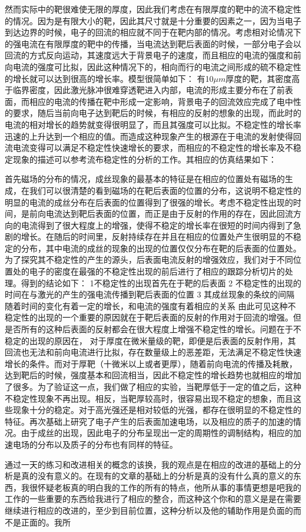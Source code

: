 然而实际中的靶很难使无限的厚度，因此我们考虑在有限厚度的靶中的流不稳定性的情况。因为是有限大小的靶，因此其尺寸就是十分重要的因素之一，因为当电子到达边界的时候，电子的回流的相应就不同于在靶内部的情况。考虑相对论情况下的强电流在有限厚度的靶中的传播，当电流达到靶后表面的时候，一部分电子会以回流的方式反向运动，其速度远大于背景电子的速度，而且相应的电流的强度和前向电流的强度可比拟，因此这种情况下的，相向而行的电流之间形成的硫不稳定性的增长就可以达到很高的增长率。模型很简单如下： 有10$\mu m$厚度的靶，其密度高于临界密度，因此激光脉冲很难穿透靶进入内部，电流的形成主要分布在了前表面，而相应的电流的传播在靶中形成一定影响，背景电子的回流效应完成了电中性的要求，随后当前向电子达到靶后的时候，有相应的反射的想象的出现，而此时的电流的相对增长的趋势就变得很明显了，而且其强度可以比拟。不稳定性的增长率迅速的上升达到一个相应的值。而造成这种现象产生的根源在于电流的发射使得回流电流变得可以满足不稳定性快速增长的要求，而相应的不稳定性的增长率及不稳定现象的描述可以参考流布稳定性的分析的工作。其相应的仿真结果如下：

首先磁场的分布的情况，成丝现象的最基本的特征是在相应的位置处有磁场的生成，在我们可以很清楚的看到磁场的在靶后表面的位置的分布，这说明不稳定性的明显的电流的成丝分布在后表面的位置得到了很强的增长。考虑不稳定性出现的时间，是前向电流达到靶后表面的位置，而正是由于反射的作用的存在，因此回流方向的电流得到了很大程度上的增强，使得不稳定的增长率在很短的时间内得到了急剧的增长。在随后的时间里，反射持续存在并且在相应的位置处产生很明显的不稳定的分布，其中电流的成丝的现象的出现的位置仅仅分布在靶的后表面的位置处。为了探究其不稳定性的产生的源头，后表面电流反射的增强效应，我们对于不同位置处的电子的密度在最强的不稳定性出现的前后进行了相应的跟踪分析切片的处理。得到的结论如下：
1不稳定性的出现首先在于靶的后表面
2 不稳定性的出现的时间在与激光的产生的强电流传播到靶后表面的位置
3 其成丝现象的条纹的间隔随着时间的变化有着一定的增长，和电流的强度有着相应的关系
由此可见这种不稳定性的出现的一个重要的原因就在于靶后表面的反射的作用对于回流的增强。但是否所有的这种后表面的反射都会在很大程度上增强不稳定性的增长。问题在于不稳定的出现的原因在， 对于厚度在微米量级的靶，即便是后表面的反射作用，其回流也无法和前向电流进行比拟，存在数量级上的恶差距，无法满足不稳定性快速增长的条件。而对于厚靶（十微米以上或者更厚），随着前向电流的传播及耗散，达到靶后的时候，强度基本和回流相当，因此不稳定性的增长趋势也就相应的增加了很多。为了验证这一点，我们做了相应的实验，当靶厚低于一定的值之后，这种不稳定性现象不再出现。相反，当靶厚较高时，很容易出现不稳定的想象，而且这些现象十分的稳定。对于高光强还是相对较低的光强，都存在很明显的不稳定性的特征。再次基础上研究了电子产生的后表面加速电场，以及相应的质子的加速的情况。由于成丝的出现，因此电子的分布呈现出一定的周期性的调制结构，相应的加速电场的分布以及质子的分布也有同样的特征。






通过一天的练习和改进相关的概念的该换，我的观点是在相应的改进的基础上的分析是真的没有意义的。在现有的文章的基础上的分析是真的没有什么真的意义的东西，我很怀疑老板真的明白我的工作的所有的特点，他所从事的事情更想是吧我的工作的一些重要的东西给我进行了相应的整合，而这种这个你和的意义是是在需要继续进行相应的改进的，至少到目前位置，这种分析以及他的辅助作用是负面的而不是正面的。我所
